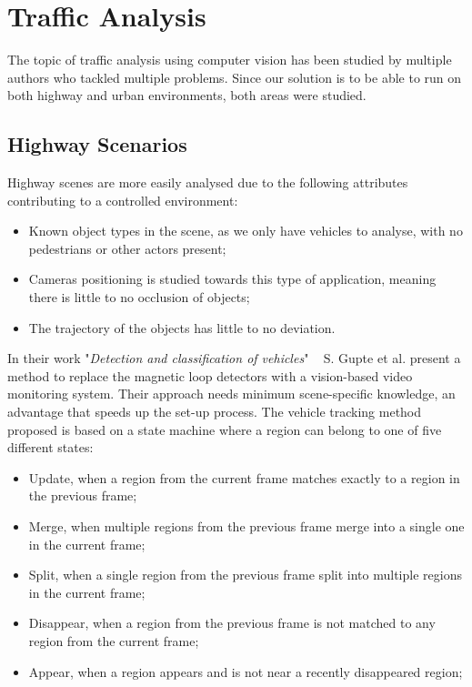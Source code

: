 \section{Traffic Analysis}

The topic of traffic analysis using computer vision has been studied by multiple authors who tackled multiple problems. Since our solution is to be able to run on both highway and urban environments, both areas were studied.

\subsection{Highway Scenarios}

Highway scenes are more easily analysed due to the following attributes contributing to a controlled environment:

\begin{itemize}
	\item Known object types in the scene, as we only have vehicles to analyse, with no pedestrians or other actors present;
	\item Cameras positioning is studied towards this type of application, meaning there is little to no occlusion of objects;
	\item The trajectory of the objects has little to no deviation.
\end{itemize}

In their work "\textit{Detection and classification of vehicles}" ~\cite{gupte_detection_2002} S. Gupte et al. present a method to replace the magnetic loop detectors with a vision-based video monitoring system. Their approach needs minimum scene-specific knowledge, an advantage that speeds up the set-up process. The vehicle tracking method proposed is based on a state machine where a region can belong to one of five different states:

\begin{itemize}
	\item Update, when a region from the current frame matches exactly to a region in the previous frame;
	\item Merge, when multiple regions from the previous frame merge into a single one in the current frame;
	\item Split, when a single region from the previous frame split into multiple regions in the current frame;
	\item Disappear, when a region from the previous frame is not matched to any region from the current frame;
	\item Appear, when a region appears and is not near a recently disappeared region;
\end{itemize}

